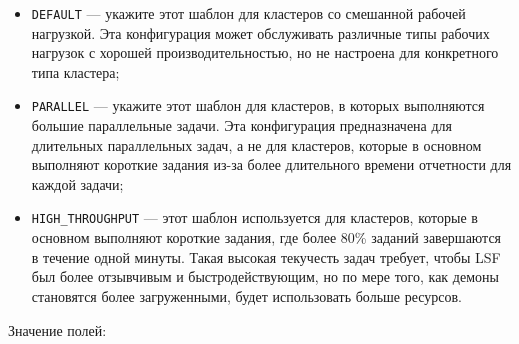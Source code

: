 \begin{itemize}
    \item \lstinline {DEFAULT} --- укажите этот шаблон для кластеров со смешанной рабочей нагрузкой. Эта конфигурация может обслуживать различные типы рабочих нагрузок с хорошей производительностью, но не настроена для конкретного типа кластера;
    \item \lstinline {PARALLEL} --- укажите этот шаблон для кластеров, в которых выполняются большие параллельные задачи. Эта конфигурация предназначена для длительных параллельных задач, а не для кластеров, которые в основном выполняют короткие задания из-за более длительного времени отчетности для каждой задачи;
    \item \lstinline {HIGH_THROUGHPUT} --- этот шаблон используется для кластеров, которые в основном выполняют короткие задания, где более 80\% заданий завершаются в течение одной минуты. Такая высокая текучесть задач требует, чтобы LSF был более отзывчивым и быстродействующим, но по мере того, как демоны становятся более загруженными, будет использовать больше ресурсов.
\end{itemize}


Значение полей:

